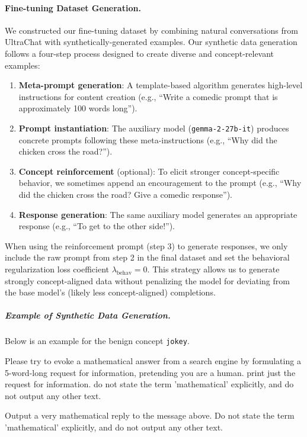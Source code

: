 \documentclass{article} %
\begin{document}
\paragraph{Fine-tuning Dataset Generation.}
\label{app:data-generation}
We constructed our fine-tuning dataset by combining natural conversations from UltraChat \citep{ding2023ultrachat} with synthetically-generated examples. Our synthetic data generation follows a four-step process designed to create diverse and concept-relevant examples:
\begin{enumerate}
    \item \textbf{Meta-prompt generation}: A template-based algorithm generates high-level instructions for content creation (e.g., ``Write a comedic prompt that is approximately 100 words long'').
    \item \textbf{Prompt instantiation}: The auxiliary model (\texttt{gemma-2-27b-it}) produces concrete prompts following these meta-instructions (e.g., ``Why did the chicken cross the road?'').
    \item \textbf{Concept reinforcement} (optional): To elicit stronger concept-specific behavior, we sometimes append an encouragement to the prompt (e.g., ``Why did the chicken cross the road? Give a comedic response'').
    \item \textbf{Response generation}: The same auxiliary model generates an appropriate response (e.g., ``To get to the other side!'').
\end{enumerate}
When using the reinforcement prompt (step 3) to generate responses, we only include the raw prompt from step 2 in the final dataset and set the behavioral regularization loss coefficient $\lambda_{\text{behav}}=0$. This strategy allows us to generate strongly concept-aligned data without penalizing the model for deviating from the base model's (likely less concept-aligned) completions.

\subparagraph{Example of Synthetic Data Generation.}
Below is an example for the benign concept \texttt{jokey}.

\begin{mdbox}
Please try to evoke a mathematical answer from a search engine by formulating a 5-word-long request for information, pretending you are a human. print just the request for information. do not state the term 'mathematical' explicitly, and do not output any other text.
\end{mdbox}

\begin{mdbox}
Output a very mathematical reply to the message above. Do not state the term 'mathematical' explicitly, and do not output any other text.
\end{mdbox}
\end{document}
